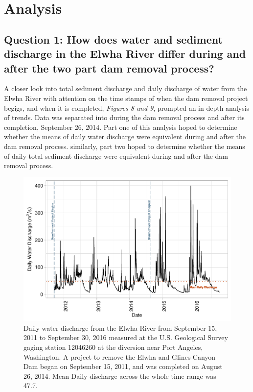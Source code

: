 \documentclass[12pt,]{article}
\begin{document}
\newpage

\hypertarget{analysis}{%
\section{Analysis}\label{analysis}}

\hypertarget{question-1-how-does-water-and-sediment-discharge-in-the-elwha-river-differ-during-and-after-the-two-part-dam-removal-process}{%
\subsection{Question 1: How does water and sediment discharge in the
Elwha River differ during and after the two part dam removal
process?}\label{question-1-how-does-water-and-sediment-discharge-in-the-elwha-river-differ-during-and-after-the-two-part-dam-removal-process}}

A closer look into total sediment discharge and daily discharge of water
from the Elwha River with attention on the time stamps of when the dam
removal project begigs, and when it is completed, \emph{Figures 8 and
9}, prompted an in depth analysis of trends. Data was separated into
during the dam removal process and after its completion, September 26,
2014. Part one of this analysis hoped to determine whether the means of
daily water discharge were equivalent during and after the dam removal
process. similarly, part two hoped to determine whether the means of
daily total sediment discharge were equivalent during and after the dam
removal process.

\begin{figure}
\centering
\includegraphics{Mason_ENV872_ProjectFinal_files/figure-latex/Intro to Question (Figure 8)-1.pdf}
\caption{Daily water discharge from the Elwha River from September 15,
2011 to September 30, 2016 measured at the U.S. Geological Survey gaging
station 12046260 at the diversion near Port Angeles, Washington. A
project to remove the Elwha and Glines Canyon Dam began on September 15,
2011, and was completed on August 26, 2014. Mean Daily discharge across
the whole time range was 47.7.}
\end{figure}
\end{document}
